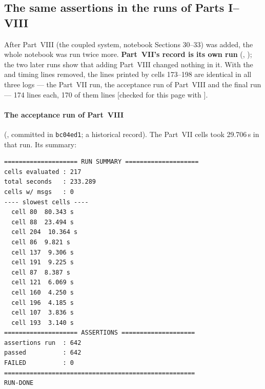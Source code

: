 \subsection{The same assertions in the runs of Parts I--VIII}
\label{sec:10.3}

After Part~VIII (the coupled system, notebook Sections 30--33) was added, the whole notebook was run
twice more. \textbf{Part~VII's record is its own run} (, ); the two
later runs show that adding Part~VIII changed nothing in it. With the  and
\cfcode{[t s]} timing lines removed, the lines printed by cells 173--198 are identical in all three
logs --- the Part~VII run, the acceptance run of Part~VIII and the final run --- 174 lines each, 170 of
them  lines [checked for this page with ].

\paragraph{The acceptance run of Part~VIII} (, committed
in \texttt{bc04ed1}; a historical record). The Part~VII cells took 29.706\,s in that run. Its summary:

\begin{Verbatim}[fontsize=\scriptsize]
==================== RUN SUMMARY ====================
cells evaluated : 217
total seconds   : 233.289
cells w/ msgs   : 0
---- slowest cells ----
  cell 80  80.343 s
  cell 88  23.494 s
  cell 204  10.364 s
  cell 86  9.821 s
  cell 137  9.306 s
  cell 191  9.225 s
  cell 87  8.387 s
  cell 121  6.069 s
  cell 160  4.250 s
  cell 196  4.185 s
  cell 107  3.836 s
  cell 193  3.140 s
==================== ASSERTIONS ====================
assertions run  : 642
passed          : 642
FAILED          : 0
====================================================
RUN-DONE
\end{Verbatim}

